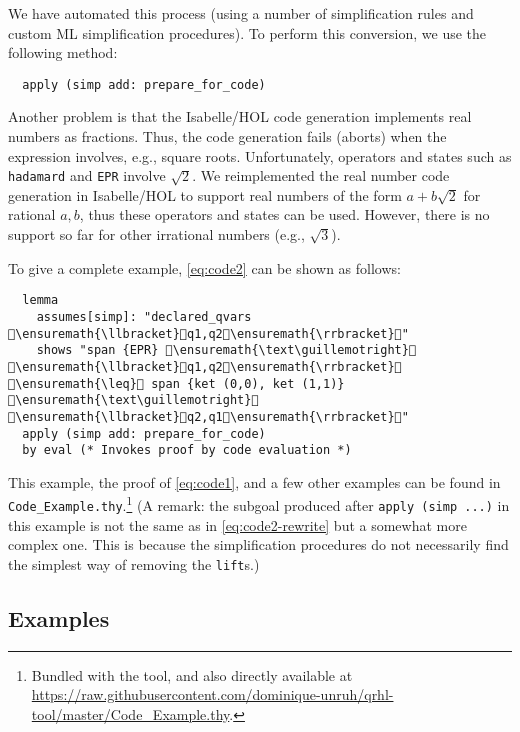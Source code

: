\documentclass{article}
\newcommand\giturl[1]{\url{https://raw.githubusercontent.com/dominique-unruh/qrhl-tool/master/#1}}
\begin{document}
We have automated this process (using a number of simplification rules
and custom ML simplification procedures). To perform this conversion,
we use the following method:
\begin{lstlisting}
  apply (simp add: prepare_for_code)
\end{lstlisting}

Another problem is that the Isabelle/HOL code generation implements
real numbers as fractions. Thus, the code generation fails (aborts) when the
expression involves, e.g., square roots. Unfortunately, operators and
states such as \texttt{hadamard} and \texttt{EPR} involve $\sqrt2$.
We reimplemented the real number code generation in Isabelle/HOL to support real numbers
of the form $a+b\sqrt 2$ for rational $a,b$, thus these operators and states can
be used. However, there is no support so far for other irrational numbers (e.g., $\sqrt 3$).

To give a complete example, \eqref{eq:code2} can be shown as follows:
\begin{lstlisting}
  lemma
    assumes[simp]: "declared_qvars \ensuremath{\llbracket}q1,q2\ensuremath{\rrbracket}"
    shows "span {EPR} \ensuremath{\text\guillemotright} \ensuremath{\llbracket}q1,q2\ensuremath{\rrbracket} \ensuremath{\leq} span {ket (0,0), ket (1,1)} \ensuremath{\text\guillemotright} \ensuremath{\llbracket}q2,q1\ensuremath{\rrbracket}"
  apply (simp add: prepare_for_code)
  by eval (* Invokes proof by code evaluation *)
\end{lstlisting}
This example, the proof of \eqref{eq:code1}, and a few other examples
can be found in \texttt{Code\_Example.thy}.\footnote{Bundled with the
  tool, and also directly available at \giturl{Code\_Example.thy}.}  (A
remark: the subgoal produced after \texttt{apply (simp ...)} in this
example is not the same as in \eqref{eq:code2-rewrite} but a somewhat
more complex one. This is because the simplification procedures do
not necessarily find the simplest way of removing the \texttt{lift}s.)

\subsection{Examples}

\newcommand\filelist[2]{\noindent\framebox{\textbf{#1 -- \texttt{#2}}}\par}

\newcommand\qrhlfile[1]{\filelist{qRHL proof script}{#1.qrhl}}
\newcommand\isafile[1]{\filelist{Isabelle/HOL theory}{#1.thy}}
\end{document}
